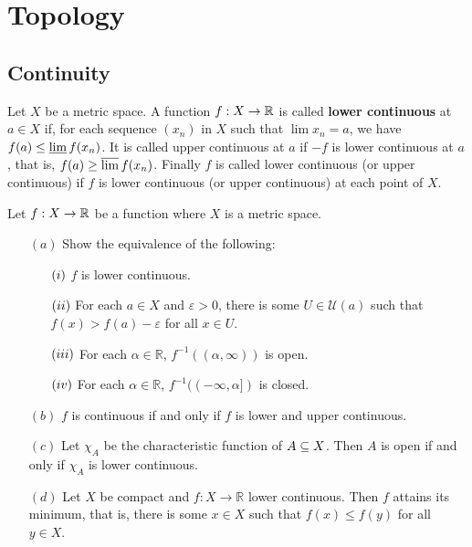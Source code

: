 \chapter{Topology}
\section{Continuity}
\begin{definition}
Let $X$ be a metric space. A function $f : X \to\mathbb{R}$ is called \textbf{lower continuous} at $a\in X$ if,
for each sequence $(x_n)$ in $X$ such that $\lim x_n=a$, we have $f(a)\leq\varliminf f(x_n)$. It is called upper continuous at $a$ if $-f$ is lower continuous at $a$, that is, $f(a)\geq\varlimsup f(x_n)$. Finally $f$ is called lower continuous (or upper continuous) if $f$ is lower continuous (or upper continuous) at each point of $X$.\\
\end{definition}
\begin{proposition}\label{lower continuous open closed iff}
Let $f:X\to\mathbb{R}$ be a function where $X$ is a metric space.
\begin{itemize}
\item[$(a)$] Show the  equivalence of the following:
\begin{itemize}
\item[$(\rmnum{1})$] $f$ is lower continuous.
\item[$(\rmnum{2})$] For each $a\in X$ and $\varepsilon>0$, there is some $U\in\mathcal{U}(a)$ such that $f(x) > f(a)-\varepsilon$ for all $x\in U$.
\item[$(\rmnum{3})$] For each $\alpha\in\mathbb{R}$, $f^{-1}((\alpha,\infty))$ is open.
\item[$(\rmnum{4})$] For each $\alpha\in\mathbb{R}$, $f^{-1}((-\infty,\alpha])$ is closed.
\end{itemize}
\item[$(b)$] $f$ is continuous if and only if $f$ is lower and upper continuous.
\item[$(c)$] Let $\chi_A$ be the characteristic function of $A\subseteq X$. Then $A$ is open if and only if $\chi_A$ is lower continuous.
\item[$(d)$] Let $X$ be compact and $f : X\to\mathbb{R}$ lower continuous. Then $f$ attains its minimum, that is, there is some $x\in X$ such that $f(x)\leq f(y)$ for all $y\in X$.
\end{itemize}
\end{proposition}
